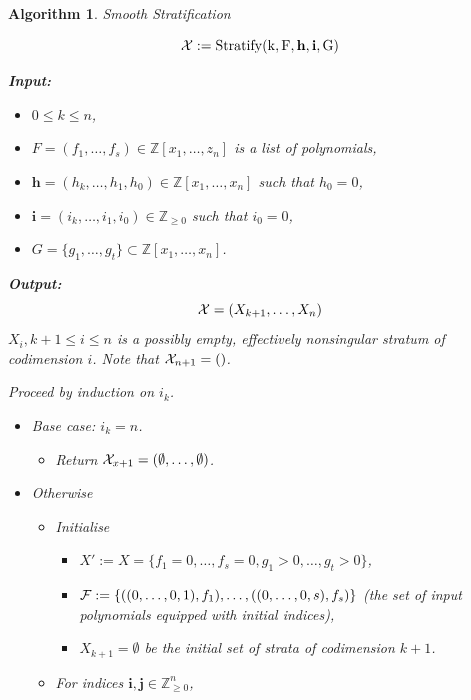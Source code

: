 \documentclass[
]{book}
\providecommand{\tightlist}{%
  \setlength{\itemsep}{0pt}\setlength{\parskip}{0pt}}
\newtheorem{algorithm}{Algorithm}
\theoremstyle{definition}
\theoremstyle{definition}
\theoremstyle{definition}
\theoremstyle{definition}
\theoremstyle{remark}
\begin{document}
\begin{algorithm}Smooth Stratification

\[{\cal X} := \rm{Stratify}(k, F, \mathbf{h}, \mathbf{i}, G)\]

\textbf{Input:}

\begin{itemize}
\tightlist
\item
  \(0 \le k \le n\),
\item
  \(F = (f_1,\ldots,f_s) \in \mathbb{Z}[x_1,\ldots,z_n]\) is a list of polynomials,
\item
  \(\mathbf{h} = (h_k, \ldots,h_1, h_0) \in \mathbb{Z}[x_1,\ldots,x_n]\) such that \(h_0 = 0\),
\item
  \(\mathbf{i} = (i_k, \ldots, i_1,i_0) \in \mathbb{Z}_{\ge 0}\) such that \(i_0 = 0\),
\item
  \(G = \{g_1,\ldots,g_t\} \subset \mathbb{Z}[x_1,\ldots,x_n]\).
\end{itemize}

\textbf{Output:}
\[
{\cal X} = (X_{k+1}, \ldots, X_n)
\]
\(X_i, k+1 \le i \le n\) is a possibly empty, effectively nonsingular stratum of codimension \(i\).
Note that \({\cal X}_{n+1} = ()\).

Proceed by induction on \(i_k\).

\begin{itemize}
\item
  Base case: \(i_k = n\).

  \begin{itemize}
  \tightlist
  \item
    Return \({\cal X}_{x+1} = (\emptyset, \ldots, \emptyset)\).
  \end{itemize}
\item
  Otherwise

  \begin{itemize}
  \item
    Initialise

    \begin{itemize}
    \item
      \(X' := X = \{ f_1 = 0,\ldots,f_s = 0, g_1 > 0, \ldots, g_t > 0 \}\),
    \item
      \({\cal F} := \{ ((0,\ldots,0,1), f_1), \ldots, ((0,\ldots,0,s), f_s) \}\)
      (the set of input polynomials equipped with initial indices),
    \item
      \(X_{k+1} = \emptyset\) be the initial set of strata of codimension \(k+1\).
    \end{itemize}
  \item
    For indices \(\mathbf{i},\mathbf{j} \in \mathbb{Z}_{\ge 0}^n\),


\end{itemize}
\end{itemize}
\end{algorithm}
\end{document}
